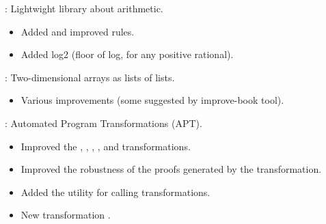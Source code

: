\begin{frame}

\implibtitle

:
Lightwight library about arithmetic.
\begin{itemize}
\item Added and improved rules.
\item Added log2 (floor of log, for any positive rational).
\end{itemize}

\end{frame}


\begin{frame}

\implibtitle

:
Two-dimensional arrays as lists of lists.
\begin{itemize}
\item Various improvements (some suggested by improve-book tool).
\end{itemize}

\end{frame}


\begin{frame}

\implibtitle

:
Automated Program Transformations (APT).
\begin{itemize}
\item Improved the , ,
  , , and
   transformations.
\item Improved the robustness of the proofs
  generated by the  transformation.
\item Added the  utility for calling transformations.
\item New transformation .
\end{itemize}

\end{frame}


